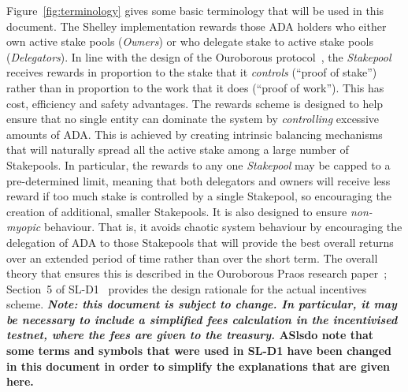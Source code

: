 \documentclass[11pt,a4paper,dvipsnames,twosided,final]{article}
\newcommand{\khcomment}[1]{\todo[color=blue!20]{KH: #1}}
\newcommand{\ada}{ADA{}}
\begin{document}
Figure~\ref{fig:terminology} gives some basic terminology that will be used in this document.
The Shelley implementation rewards those \ada{} holders who either own active stake pools
(\emph{Owners}) or who delegate stake to active stake pools (\emph{Delegators}).
In line with the design of the Ouroborous protocol~\cite{ouroboros_classic}, the \emph{Stakepool} receives
rewards in proportion to the stake that it \emph{controls} (``proof of
stake'') rather than in proportion to the work that it does (``proof of work'').
This has cost, efficiency and safety advantages.
The rewards scheme is designed to help ensure that no single entity can
dominate the system by \emph{controlling} excessive amounts of \ada{}.  This is achieved by creating intrinsic
balancing mechanisms that will naturally spread all the active stake among a large number of Stakepools.
In particular, the rewards to any one \emph{Stakepool} may be capped to a pre-determined limit,
meaning that both delegators and owners will receive less reward if too much stake is controlled by a single Stakepool,
so encouraging the creation of additional, smaller Stakepools.
It is also designed to ensure \emph{non-myopic} behaviour.  That is, it avoids chaotic system behaviour by encouraging the delegation of \ada{} to those Stakepools that will provide
the best overall returns over an extended period of time rather than over the short term.
The overall theory that ensures this is described in the Ouroborous Praos research
paper~\cite{ouroboros_praos}; Section~5 of SL-D1~\cite{delegation_design} provides the design rationale
for the actual incentives scheme.
\textbf{\emph{Note: this document is subject to change.  In particular, it may be necessary to include a simplified fees calculation
    in the incentivised testnet, where the fees are given to the treasury\khcomment{Check fees.}.}
ASlsdo note that some terms and symbols that were used in SL-D1 have been changed in this document
in order to simplify the explanations that are given here.
}
\end{document}
